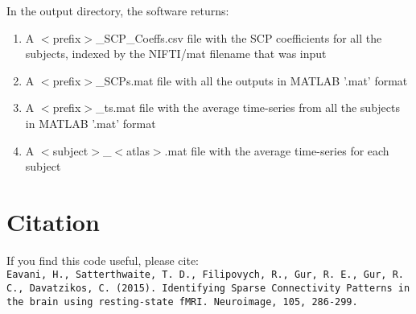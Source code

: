 \documentclass[12pt]{article}
\begin{document}
In the output directory, the software returns:
\begin{enumerate}
 \item A $<$prefix$>$\_SCP\_Coeffs.csv file with the SCP coefficients for all the subjects, indexed by the NIFTI/mat filename that was input
 \item A $<$prefix$>$\_SCPs.mat file with all the outputs in MATLAB '.mat' format
 \item A $<$prefix$>$\_ts.mat file with the average time-series from all the subjects in MATLAB '.mat' format
 \item A $<$subject$>$\_$<$atlas$>$.mat file with the average time-series for each subject 
\end{enumerate}

\section{Citation}
If you find this code useful, please cite: \\
\texttt{Eavani, H., Satterthwaite, T. D., Filipovych, R., Gur, R. E., Gur, R. C.,  Davatzikos, C. (2015). Identifying Sparse Connectivity Patterns in the brain using resting-state fMRI. Neuroimage, 105, 286-299.}
\end{document}
